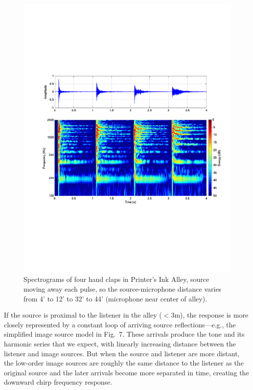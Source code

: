 \documentclass{aes137}
\begin{document}
\begin{figure}[h!] \centering \includegraphics[width=\linewidth]{images/P12C_irsg_cropped.pdf} \caption{Spectrograms of four hand claps in Printer's Ink Alley, source moving away each pulse, so the source-microphone distance varies from 4' to 12' to 32' to 44' (microphone near center of alley).} \end{figure}

If the source is proximal to the listener in the alley ($<3$m), the response is more closely represented by a constant loop of arriving source reflections---e.g., the simplified image source model in Fig.~7. These arrivals produce the tone and its harmonic series that we expect, with linearly increasing distance between the listener and image sources. But when the source and listener are more distant, the low-order image sources are roughly the same distance to the listener as the original source and the later arrivals become more separated in time, creating the downward chirp frequency response.
\end{document}
